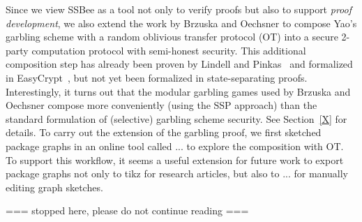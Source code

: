Since we view SSBee as a tool not only to verify proofs but also to support \emph{proof development},
we also extend the work by Brzuska and Oechsner to compose Yao's garbling scheme with a random oblivious transfer protocol (OT) into a secure 2-party computation protocol with semi-honest security. This additional composition step has already been proven by Lindell and Pinkas~\cite{X} and formalized in EasyCrypt~\cite{X}, but not yet been formalized in state-separating proofs. Interestingly, it turns out that the modular garbling games used by Brzuska and Oechsner compose more conveniently (using the
SSP approach) than the standard formulation of (selective) garbling scheme security. See Section~\ref{X} for details. To carry out the extension of the garbling proof, we first sketched package graphs in an online tool called ... to explore the composition with OT. To support this workflow, it seems a useful
extension for future work to export package graphs not only to tikz for research articles, but also
to ... for manually editing graph sketches.






\iffalse
=== stopped here, please do not continue reading ===

